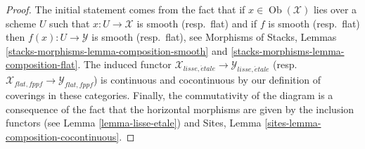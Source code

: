 \documentclass{stacks-project}
\theoremstyle{plain}
\theoremstyle{definition}
\theoremstyle{remark}
\numberwithin{equation}{subsection}
\def\Ob{\mathop{\mathrm{Ob}}\nolimits}
\def\etale{{\acute{e}tale}}
\begin{document}
\begin{proof}
The initial statement comes from the fact that if $x \in \Ob(\mathcal{X})$
lies over a scheme $U$ such that $x : U \to \mathcal{X}$ is smooth
(resp.\ flat) and if $f$ is smooth (resp.\ flat) then
$f(x) : U \to \mathcal{Y}$ is smooth (resp.\ flat), see
Morphisms of Stacks, Lemmas \ref{stacks-morphisms-lemma-composition-smooth} and
\ref{stacks-morphisms-lemma-composition-flat}. The induced functor
$\mathcal{X}_{lisse,\etale} \to \mathcal{Y}_{lisse,\etale}$
(resp.\ $\mathcal{X}_{flat,fppf} \to \mathcal{Y}_{flat,fppf}$) is
continuous and cocontinuous by our definition of coverings in these
categories. Finally, the commutativity of the diagram is a consequence of the
fact that the horizontal morphisms are given by the inclusion functors (see
Lemma \ref{lemma-lisse-etale}) and
Sites, Lemma \ref{sites-lemma-composition-cocontinuous}.


\end{proof}
\end{document}

